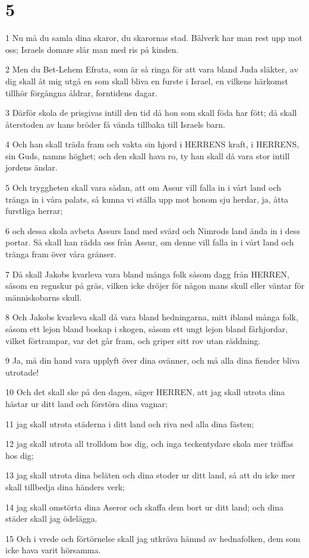 \chapter{5}

\par 1 Nu må du samla dina skaror, du skarornas stad. Bålverk har man rest upp mot oss; Israels domare slår man med ris på kinden.
\par 2 Men du Bet-Lehem Efrata, som är så ringa för att vara bland Juda släkter, av dig skall åt mig utgå en som skall bliva en furste i Israel, en vilkens härkomst tillhör förgångna åldrar, forntidens dagar.
\par 3 Därför skola de prisgivas intill den tid då hon som skall föda har fött; då skall återstoden av hans bröder få vända tillbaka till Israels barn.
\par 4 Och han skall träda fram och vakta sin hjord i HERRENS kraft, i HERRENS, sin Guds, namns höghet; och den skall hava ro, ty han skall då vara stor intill jordens ändar.
\par 5 Och tryggheten skall vara sådan, att om Assur vill falla in i vårt land och tränga in i våra palats, så kunna vi ställa upp mot honom sju herdar, ja, åtta furstliga herrar;
\par 6 och dessa skola avbeta Assurs land med svärd och Nimrods land ända in i dess portar. Så skall han rädda oss från Assur, om denne vill falla in i vårt land och tränga fram över våra gränser.
\par 7 Då skall Jakobs kvarleva vara bland många folk såsom dagg från HERREN, såsom en regnskur på gräs, vilken icke dröjer för någon mans skull eller väntar för människobarns skull.
\par 8 Och Jakobs kvarleva skall då vara bland hedningarna, mitt ibland många folk, såsom ett lejon bland boskap i skogen, såsom ett ungt lejon bland fårhjordar, vilket förtrampar, var det går fram, och griper sitt rov utan räddning.
\par 9 Ja, må din hand vara upplyft över dina ovänner, och må alla dina fiender bliva utrotade!
\par 10 Och det skall ske på den dagen, säger HERREN, att jag skall utrota dina hästar ur ditt land och förstöra dina vagnar;
\par 11 jag skall utrota städerna i ditt land och riva ned alla dina fästen;
\par 12 jag skall utrota all trolldom hos dig, och inga teckentydare skola mer träffas hos dig;
\par 13 jag skall utrota dina beläten och dina stoder ur ditt land, så att du icke mer skall tillbedja dina händers verk;
\par 14 jag skall omstörta dina Aseror och skaffa dem bort ur ditt land; och dina städer skall jag ödelägga.
\par 15 Och i vrede och förtörnelse skall jag utkräva hämnd av hednafolken, dem som icke hava varit hörsamma.

